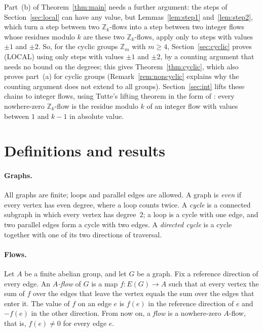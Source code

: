 \documentclass[11pt]{article}
\theoremstyle{definition}
\newcommand{\Z}{\mathbb{Z}}
\begin{document}
Part~(b) of
Theorem~\ref{thm:main} needs a further argument: the steps of Section~\ref{sec:local} can have any value, but
Lemmas~\ref{lem:step1} and~\ref{lem:step2}, which turn a step between two $\Z_k$-flows into a step between two integer flows
whose residues modulo $k$ are these two $\Z_k$-flows, apply only to steps with values $\pm1$
and $\pm2$. So, for the cyclic groups $\Z_m$ with $m\ge 4$,
Section~\ref{sec:cyclic} proves \textup{(LOCAL)} using only steps with values $\pm1$ and $\pm2$, by a counting argument
that needs no bound on the degrees; this gives Theorem~\ref{thm:cyclic}, which also proves part~(a) for cyclic groups
(Remark~\ref{rem:noncyclic} explains why the counting argument does not extend to all groups). Section~\ref{sec:int} lifts these chains to
integer flows, using Tutte's lifting theorem \cite{Tutte} in the form of \cite[Theorem~2.3]{EHLMNS}: every nowhere-zero
$\Z_k$-flow is the residue modulo $k$ of an integer flow with values between $1$ and $k-1$ in absolute value.

\section{Definitions and results}\label{sec:words}

\paragraph{Graphs.} All graphs are finite; loops and parallel edges are allowed. A graph is \emph{even} if every
vertex has even degree, where a loop counts twice. A \emph{cycle} is a connected subgraph in which every vertex has
degree~$2$; a loop is a cycle with one edge, and two parallel edges form a cycle with two edges. A \emph{directed
cycle} is a cycle together with one of its two directions of traversal.

\paragraph{Flows.} Let $A$ be a finite abelian group, and let $G$ be a graph. Fix a
reference direction of every edge. An \emph{$A$-flow} of $G$ is a map $f\colon E(G)\to A$ such that at every vertex
the sum of $f$ over the edges that leave the vertex equals the sum over the edges that enter it. The value of $f$ on an
edge $e$ is $f(e)$ in the reference direction of $e$ and $-f(e)$ in the other direction. From now on, a \emph{flow}
is a nowhere-zero $A$-flow, that is, $f(e)\ne 0$ for every edge $e$.
\end{document}
